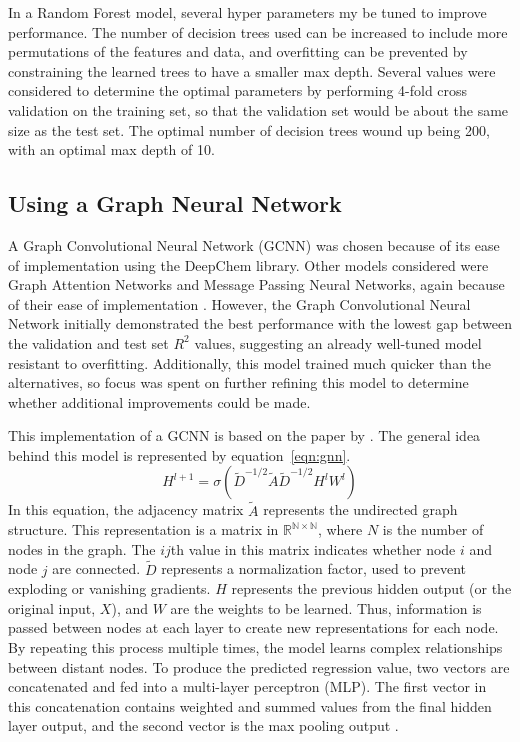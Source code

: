 \documentclass[12pt, oneside]{article}   	%
\begin{document}
In a Random Forest model, several hyper parameters my be tuned to improve performance. The number of decision trees used can be increased to include more permutations of the features and data, and overfitting can be prevented by constraining the learned trees to have a smaller max depth. Several values were considered to determine the optimal parameters by performing 4-fold cross validation on the training set, so that the validation set would be about the same size as the test set. The optimal number of decision trees wound up being 200, with an optimal max depth of 10.

\subsection{Using a Graph Neural Network}
	A Graph Convolutional Neural Network (GCNN) was chosen because of its ease of implementation using the DeepChem library. Other models considered were Graph Attention Networks and Message Passing Neural Networks, again because of their ease of implementation \cite{Velickovic2017, Gilmer2017}. However, the Graph Convolutional Neural Network initially demonstrated the best performance with the lowest gap between the validation and test set $R^2$ values, suggesting an already well-tuned model resistant to overfitting. Additionally, this model trained much quicker than the alternatives, so focus was spent on further refining this model to determine whether additional improvements could be made.

	This implementation of a GCNN is based on the paper by \cite{Kipf2016}. The general idea behind this model is represented by equation~\ref{eqn:gnn}. 
\begin{equation}\label{eqn:gnn}
H^{l+1} = \sigma(\tilde{D}^{-1/2}\tilde{A}\tilde{D}^{-1/2}H^{l}W^l)
\end{equation}
In this equation, the adjacency matrix $\tilde{A}$ represents the undirected graph structure. This representation is a matrix in $\mathbb{R^{N\times N}}$, where $N$ is the number of nodes in the graph. The $ij$th value in this matrix indicates whether node $i$ and node $j$ are connected. $\tilde{D}$ represents a normalization factor, used to prevent exploding or vanishing gradients. $H$ represents the previous hidden output (or the original input, $X$), and $W$ are the weights to be learned. Thus, information is passed between nodes at each layer to create new representations for each node. By repeating this process multiple times, the model learns complex relationships between distant nodes. To produce the predicted regression value, two vectors are concatenated and fed into a multi-layer perceptron (MLP). The first vector in this concatenation contains weighted and summed values from the final hidden layer output, and the second vector is the max pooling output \cite{gcnmodel}.
\end{document}
